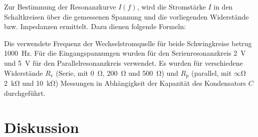 	Zur Bestimmung der Resonanzkurve $I(f)$, wird die Stromstärke $I$ in den Schaltkreisen über die gemessenen Spannung und die vorliegenden Widerstände bzw. Impedanzen ermittelt.
	Dazu dienen folgende Formeln:
	
	
	Die verwendete Frequenz der Wechselstromquelle für beide Schwingkreise betrug \SI{1000}{\hertz}.
	Für die Eingangspannungen wurden für den Serienresonanzkreis \SI{2}{\volt} und \SI{5}{\volt} für den Parallelresonanzkreis verwendet.
	Es wurden für verschiedene Widerstände $R_\text{v}$ (Serie, mit \SI{0}{\ohm}, \SI{200}{\ohm} und \SI{500}{\ohm}) und $R_\text{p}$ (parallel, mit $\infty$\si{\ohm} \SI{2}{\kilo\ohm} und \SI{10}{\kilo\ohm}) Messungen in Abhängigkeit der Kapazität des Kondensators $C$ durchgeführt.
\section{Diskussion}




